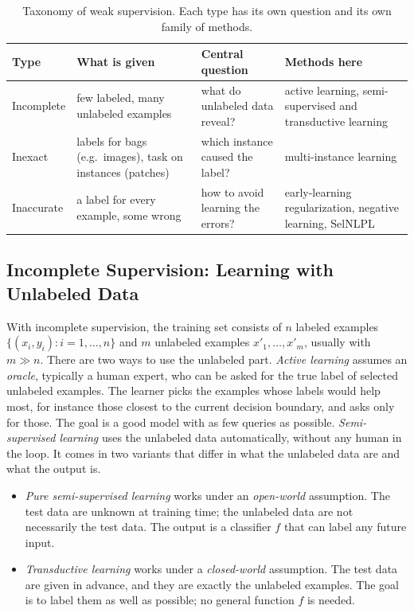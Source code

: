\begin{table}[ht]
  \centering
  \begin{tabular}{@{}p{2.2cm}p{4.4cm}p{3.9cm}p{4.2cm}@{}}
    \toprule
    Type & What is given & Central question & Methods here \\
    \midrule
    Incomplete & few labeled, many unlabeled examples & what do unlabeled
      data reveal? & active learning, semi-supervised and transductive
      learning \\
    Inexact & labels for bags (e.g.\ images), task on instances (patches) &
      which instance caused the label? & multi-instance learning \\
    Inaccurate & a label for every example, some wrong & how to avoid
      learning the errors? & early-learning regularization, negative
      learning, SelNLPL \\
    \bottomrule
  \end{tabular}
  \caption{Taxonomy of weak supervision. Each type has its own question and
  its own family of methods.}
  \label{tab:weak-types}
\end{table}

\subsection{Incomplete Supervision: Learning with Unlabeled Data}

With incomplete supervision, the training set consists of $n$ labeled
examples $\{(x_i,y_i): i=1,\dots,n\}$ and $m$ unlabeled examples
$x'_1,\dots,x'_m$, usually with $m\gg n$. There are two ways to use the
unlabeled part. \emph{Active learning} assumes an \emph{oracle}, typically a
human expert, who can be asked for the true label of selected unlabeled
examples. The learner picks the examples whose labels would help most, for
instance those closest to the current decision boundary, and asks only for
those. The goal is a good model with as few queries as possible.
\emph{Semi-supervised learning} uses the unlabeled data automatically,
without any human in the loop. It comes in two variants that differ in what
the unlabeled data are and what the output is.

\begin{itemize}
  \item \emph{Pure semi-supervised learning} works under an
    \emph{open-world} assumption. The test data are unknown at training time;
    the unlabeled data are not necessarily the test data. The output is a
    classifier $f$ that can label any future input.
  \item \emph{Transductive learning} works under a \emph{closed-world}
    assumption. The test data are given in advance, and they are exactly the
    unlabeled examples. The goal is to label them as well as possible; no
    general function $f$ is needed.
\end{itemize}

